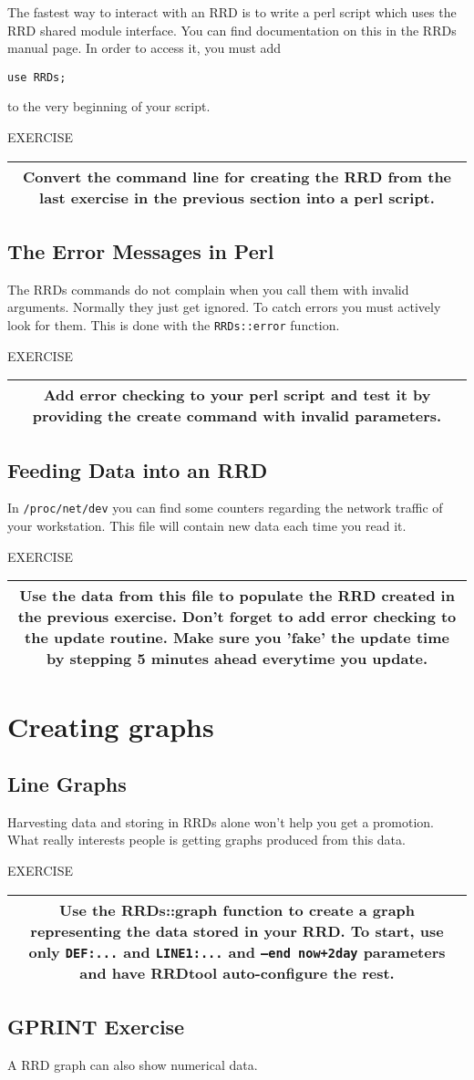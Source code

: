 \documentclass[a4paper,12pt]{article}
\newenvironment{work}{\textsf{\tiny EXERCISE}\nopagebreak\\[0.3ex]\begin{tabular}{|c|}
 \hline
 \begin{minipage}{0.965\linewidth}%
 \setlength{\parskip}{1.6ex plus 0.6ex minus 0.4ex}%
 \rule{0pt}{2.8ex}\ignorespaces}
{\rule[-1.8ex]{0pt}{0pt}\end{minipage}\\
 \hline
 \end{tabular}}
\newcommand{\ex}[1]{\subsection{#1}}
\newcommand{\cmd}[1]{\texttt{\mbox{#1}}}
\begin{document}
The fastest way to interact with an RRD is to write a perl script
which uses the RRD shared module interface. You can find documentation
on this in the RRDs manual page. In order to access it, you must
add 

\cmd{use RRDs;}

to the very beginning of your script.

\begin{work}
Convert the command line for creating the RRD from the last exercise
in the previous section into a perl script.
\end{work}

\ex{The Error Messages in Perl}
The RRDs commands do not complain when you call them with invalid
arguments. Normally they just get ignored. To catch errors you must
actively look for them. This is done with the \cmd{RRDs::error}
function.

\begin{work}
Add error checking to your perl script and test it by providing the
create command with invalid parameters.
\end{work}

\ex{Feeding Data into an RRD}
In \cmd{/proc/net/dev} you can find some counters regarding the
network traffic of your workstation. This file will contain new data each time you read it.

\begin{work}
  Use the data from this file to populate the RRD created in the previous
  exercise. Don't forget to add error checking to the update routine. Make
  sure you 'fake' the update time by stepping 5 minutes ahead everytime you
  update.
\end{work}

\section{Creating graphs}

\ex{Line Graphs}
Harvesting data and storing in RRDs alone won't help you get a
promotion. What really interests people is getting graphs produced from
this data.

\begin{work}
Use the RRDs::graph function to create a graph representing the data
stored in your RRD. To start, use only \cmd{DEF:...} and \cmd{LINE1:...}
and \cmd{--end now+2day} parameters and have RRDtool
auto-configure the rest. 
\end{work}

\ex{GPRINT Exercise}
A RRD graph can also show numerical data.
\end{document}
